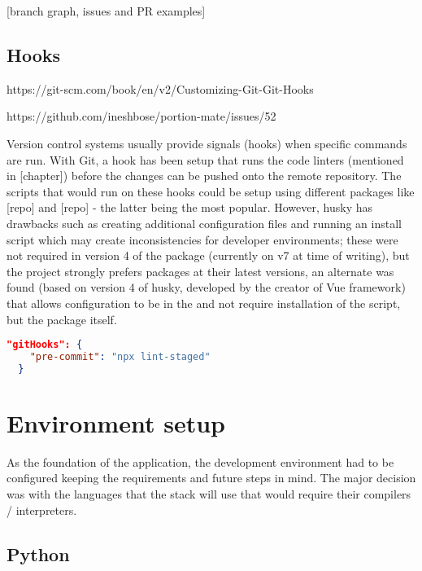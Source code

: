 \documentclass{l4proj}
\begin{document}
[branch graph, issues and PR examples]

\subsection{Hooks}

https://git-scm.com/book/en/v2/Customizing-Git-Git-Hooks

https://github.com/ineshbose/portion-mate/issues/52

Version control systems usually provide signals (hooks) when specific commands are run. With Git, a  hook has been setup that runs the code linters (mentioned in [chapter]) before the changes can be pushed onto the remote repository. The scripts that would run on these hooks could be setup using different packages like  [repo] and  [repo] - the latter being the most popular. However, husky has drawbacks such as creating additional configuration files and running an install script which may create inconsistencies for developer environments; these were not required in version 4 of the package (currently on v7 at time of writing), but the project strongly prefers packages at their latest versions, an alternate  was found (based on version 4 of husky, developed by the creator of Vue framework) that allows configuration to be in the  and not require installation of the script, but the package itself.

\begin{lstlisting}[language=json,caption={\href{https://github.com/ineshbose/portion-mate/blob/c51ee3f32d05df641157467169e9659732202b7b/package.json\#L22}{\code{./package.json}}}]
  "gitHooks": {
    "pre-commit": "npx lint-staged"
  }
\end{lstlisting}

\section{Environment setup}

As the foundation of the application, the development environment had to be configured keeping the requirements and future steps in mind. The major decision was with the languages that the stack will use that would require their compilers / interpreters.

\subsection{Python}
\end{document}
